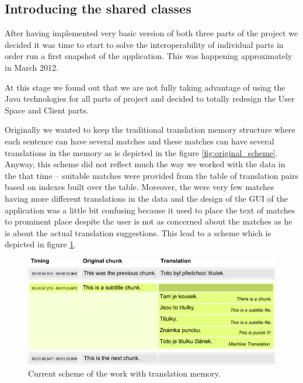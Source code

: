 \subsection{Introducing the shared classes}
\label{subsec:introducing_shared_classes}

After having implemented very basic version of both three parts of the project we decided it was time to start to solve the interoperability of individual parts in order run a first snapshot of the application. This was happening approximately in March 2012.

At this stage we found out that we are not fully taking advantage of using the Java technologies for all parts of project and decided to totally redesign the User Space and Client parts.

Originally we wanted to keep the traditional translation memory structure where each sentence can have several matches and these matches can have several translations in the memory as is depicted in the figure \ref{fig:original_scheme}. Anyway, this scheme did not reflect much the way we worked with the data in the that time -- suitable matches were provided from the table of translation pairs based on indexes built over the table. Moreover, the were very few matches having more different translations in the data and the design of the GUI of the application was a little bit confusing because it used to place the text of matches to prominent place despite the user is not as concerned about the matches as he is about the actual translation suggestions. This lead to a scheme which is depicted in figure \ref{fig:new_scheme}.

\begin{figure}
\begin{center}
\includegraphics{./figures/current_strucutre.pdf}
\end{center}
\caption{Current scheme of the work with translation memory.}\label{fig:new_scheme}
\end{figure}

